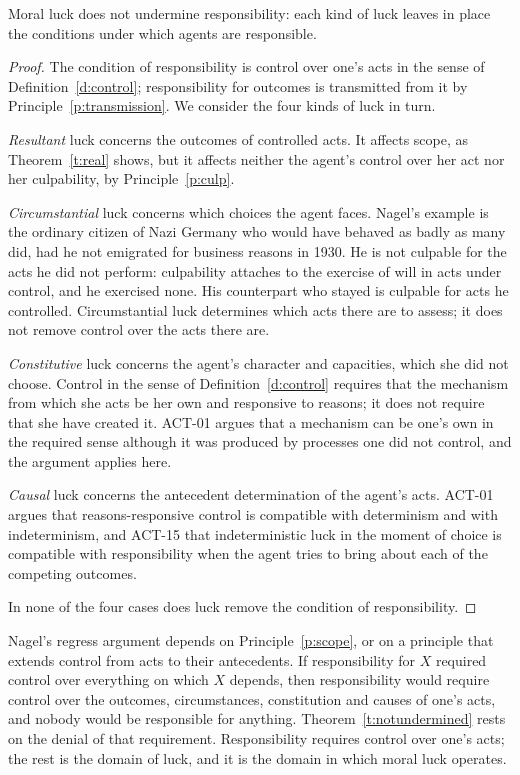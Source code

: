 \documentclass{situationist-preprint}
\begin{document}
\begin{theorem}\label{t:notundermined}
Moral luck does not undermine responsibility: each kind of luck leaves in place the conditions under which agents are responsible.
\end{theorem}

\begin{proof}
The condition of responsibility is control over one's acts in the sense of Definition~\ref{d:control}; responsibility for outcomes is transmitted from it by Principle~\ref{p:transmission}. We consider the four kinds of luck in turn.

\emph{Resultant} luck concerns the outcomes of controlled acts. It affects scope, as Theorem~\ref{t:real} shows, but it affects neither the agent's control over her act nor her culpability, by Principle~\ref{p:culp}.

\emph{Circumstantial} luck concerns which choices the agent faces. Nagel's example is the ordinary citizen of Nazi Germany who would have behaved as badly as many did, had he not emigrated for business reasons in 1930. He is not culpable for the acts he did not perform: culpability attaches to the exercise of will in acts under control, and he exercised none. His counterpart who stayed is culpable for acts he controlled. Circumstantial luck determines which acts there are to assess; it does not remove control over the acts there are.

\emph{Constitutive} luck concerns the agent's character and capacities, which she did not choose. Control in the sense of Definition~\ref{d:control} requires that the mechanism from which she acts be her own and responsive to reasons; it does not require that she have created it. ACT-01 argues that a mechanism can be one's own in the required sense although it was produced by processes one did not control, and the argument applies here.

\emph{Causal} luck concerns the antecedent determination of the agent's acts. ACT-01 argues that reasons-responsive control is compatible with determinism and with indeterminism, and ACT-15 that indeterministic luck in the moment of choice is compatible with responsibility when the agent tries to bring about each of the competing outcomes.

In none of the four cases does luck remove the condition of responsibility.
\end{proof}

Nagel's regress argument depends on Principle~\ref{p:scope}, or on a principle that extends control from acts to their antecedents. If responsibility for $X$ required control over everything on which $X$ depends, then responsibility would require control over the outcomes, circumstances, constitution and causes of one's acts, and nobody would be responsible for anything. Theorem~\ref{t:notundermined} rests on the denial of that requirement. Responsibility requires control over one's acts; the rest is the domain of luck, and it is the domain in which moral luck operates.
\end{document}
